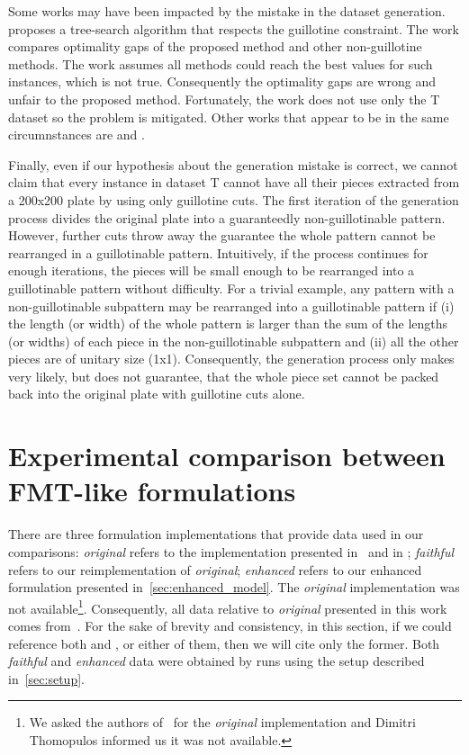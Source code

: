 \documentclass[ppgc,tese,english,formais,babel]{iiufrgs}
\begin{document}
Some works may have been impacted by the mistake in the dataset generation.
\citet{bortfeldt:2012} %
proposes a tree-search algorithm that respects the guillotine constraint.
The work compares optimality gaps of the proposed method and other non-guillotine methods.
The work assumes all methods could reach the best values for such instances, which is not true.
Consequently the optimality gaps are wrong and unfair to the proposed method.
Fortunately, the work does not use only the T dataset so the problem is mitigated.
Other works that appear to be in the same circumnstances are
\citet{thomas:2014} and %
\citet{shang:2020}. %

Finally, even if our hypothesis about the generation mistake is correct, we cannot claim that every instance in dataset T cannot have all their pieces extracted from a 200x200 plate by using only guillotine cuts.
The first iteration of the generation process divides the original plate into a guaranteedly non-guillotinable pattern.
However, further cuts throw away the guarantee the whole pattern cannot be rearranged in a guillotinable pattern.
Intuitively, if the process continues for enough iterations, the pieces will be small enough to be rearranged into a guillotinable pattern without difficulty.
For a trivial example, any pattern with a non-guillotinable subpattern may be rearranged into a guillotinable pattern if (i) the length (or width) of the whole pattern is larger than the sum of the lengths (or widths) of each piece in the non-guillotinable subpattern and (ii) all the other pieces are of unitary size (1x1).
Consequently, the generation process only makes very likely, but does not guarantee, that the whole piece set cannot be packed back into the original plate with guillotine cuts alone.

\chapter{Experimental comparison between FMT-like formulations}
\label{sec:experimental_results}
\label{sec:furini_vs_enhanced_comparison}

There are three formulation implementations that provide data used in our comparisons:
\emph{original} refers to the implementation presented in~\citet{furini:2016} and in \citet{dimitri_thesis};
\emph{faithful} refers to our reimplementation of \emph{original};
\emph{enhanced} refers to our enhanced formulation presented in~\cref{sec:enhanced_model}.
The \emph{original} implementation was not available\footnote{
	We asked the authors of~\citet{furini:2016} for the \emph{original} implementation and Dimitri Thomopulos informed us it was not available.
}.
Consequently, all data relative to \emph{original} presented in this work comes from~\citet{dimitri_thesis}.
For the sake of brevity and consistency, in this section, if we could reference both \citet{dimitri_thesis} and \citet{furini:2016}, or either of them, then we will cite only the former.
Both \emph{faithful} and \emph{enhanced} data were obtained by runs using the setup described in~\cref{sec:setup}.
\end{document}

